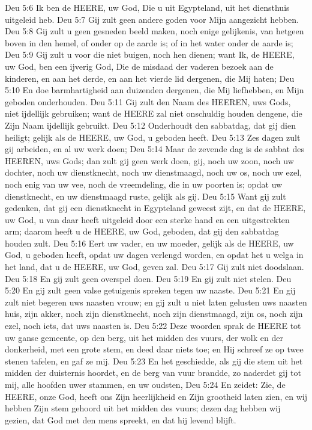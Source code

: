 Deu 5:6  Ik ben de HEERE, uw God, Die u uit Egypteland, uit het diensthuis uitgeleid heb.
Deu 5:7  Gij zult geen andere goden voor Mijn aangezicht hebben.
Deu 5:8  Gij zult u geen gesneden beeld maken, noch enige gelijkenis, van hetgeen boven in den hemel, of onder op de aarde is; of in het water onder de aarde is;
Deu 5:9  Gij zult u voor die niet buigen, noch hen dienen; want Ik, de HEERE, uw God, ben een ijverig God, Die de misdaad der vaderen bezoek aan de kinderen, en aan het derde, en aan het vierde lid dergenen, die Mij haten;
Deu 5:10  En doe barmhartigheid aan duizenden dergenen, die Mij liefhebben, en Mijn geboden onderhouden.
Deu 5:11  Gij zult den Naam des HEEREN, uws Gods, niet ijdellijk gebruiken; want de HEERE zal niet onschuldig houden dengene, die Zijn Naam ijdellijk gebruikt.
Deu 5:12  Onderhoudt den sabbatdag, dat gij dien heiligt; gelijk als de HEERE, uw God, u geboden heeft.
Deu 5:13  Zes dagen zult gij arbeiden, en al uw werk doen;
Deu 5:14  Maar de zevende dag is de sabbat des HEEREN, uws Gods; dan zult gij geen werk doen, gij, noch uw zoon, noch uw dochter, noch uw dienstknecht, noch uw dienstmaagd, noch uw os, noch uw ezel, noch enig van uw vee, noch de vreemdeling, die in uw poorten is; opdat uw dienstknecht, en uw dienstmaagd ruste, gelijk als gij.
Deu 5:15  Want gij zult gedenken, dat gij een dienstknecht in Egypteland geweest zijt, en dat de HEERE, uw God, u van daar heeft uitgeleid door een sterke hand en een uitgestrekten arm; daarom heeft u de HEERE, uw God, geboden, dat gij den sabbatdag houden zult.
Deu 5:16  Eert uw vader, en uw moeder, gelijk als de HEERE, uw God, u geboden heeft, opdat uw dagen verlengd worden, en opdat het u welga in het land, dat u de HEERE, uw God, geven zal.
Deu 5:17  Gij zult niet doodslaan.
Deu 5:18  En gij zult geen overspel doen.
Deu 5:19  En gij zult niet stelen.
Deu 5:20  En gij zult geen valse getuigenis spreken tegen uw naaste.
Deu 5:21  En gij zult niet begeren uws naasten vrouw; en gij zult u niet laten gelusten uws naasten huis, zijn akker, noch zijn dienstknecht, noch zijn dienstmaagd, zijn os, noch zijn ezel, noch iets, dat uws naasten is.
Deu 5:22  Deze woorden sprak de HEERE tot uw ganse gemeente, op den berg, uit het midden des vuurs, der wolk en der donkerheid, met een grote stem, en deed daar niets toe; en Hij schreef ze op twee stenen tafelen, en gaf ze mij.
Deu 5:23  En het geschiedde, als gij die stem uit het midden der duisternis hoordet, en de berg van vuur brandde, zo naderdet gij tot mij, alle hoofden uwer stammen, en uw oudsten,
Deu 5:24  En zeidet: Zie, de HEERE, onze God, heeft ons Zijn heerlijkheid en Zijn grootheid laten zien, en wij hebben Zijn stem gehoord uit het midden des vuurs; dezen dag hebben wij gezien, dat God met den mens spreekt, en dat hij levend blijft.
